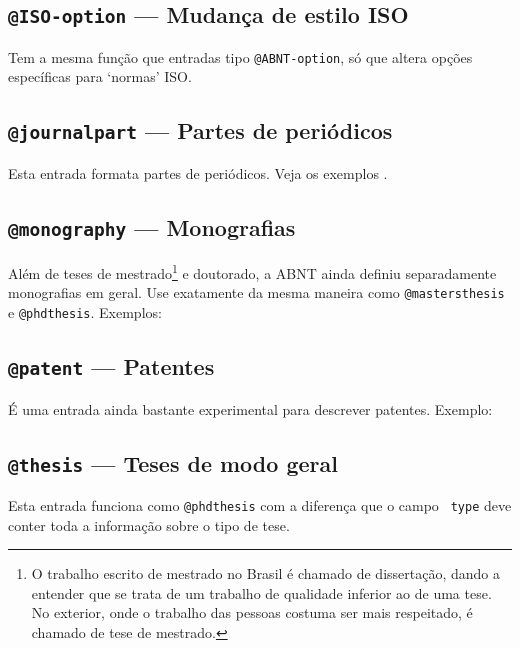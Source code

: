 \documentclass[a4paper]{ltxdoc}
\begin{document}
\subsection{\texttt{@ISO-option} --- Mudança de estilo ISO}

Tem a mesma função que entradas tipo \texttt{@ABNT-option}, só que altera
opções específicas para `normas' ISO.

\subsection{\texttt{@journalpart} --- Partes de periódicos }

Esta entrada formata partes de periódicos. Veja os exemplos
.

\subsection{\texttt{@monography} --- Monografias}

Além de teses de mestrado\footnote{O trabalho escrito de mestrado no Brasil
é chamado de dissertação, dando a entender que se trata de um trabalho
de qualidade inferior ao de uma tese. No exterior, onde o trabalho das pessoas
costuma ser mais respeitado, é chamado de tese de mestrado.} e doutorado, a
ABNT ainda definiu separadamente monografias em geral. Use exatamente da mesma
maneira como \texttt{@mastersthesis} e \texttt{@phdthesis}. Exemplos:

\subsection{\texttt{@patent} --- Patentes}

É uma entrada ainda bastante experimental para descrever patentes. Exemplo:

\subsection{\texttt{@thesis} --- Teses de modo geral}

Esta entrada funciona como \texttt{@phdthesis} com a diferença que o campo \texttt{
type} deve conter toda a informação sobre o tipo de tese. 
\end{document}
